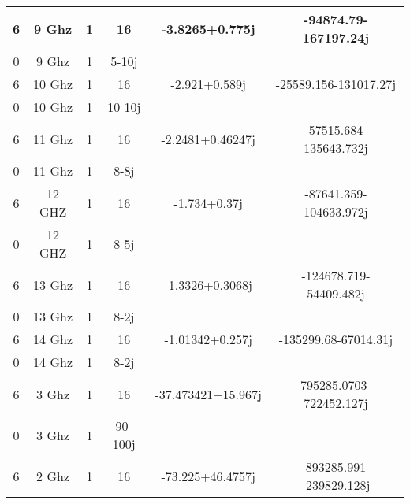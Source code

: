\documentclass[12pt,letterpaper]{report}
\numberwithin{equation}{section}
\begin{document}
\begin{table}[H]
\begin{tabular}{@{}|c|c|c|c|c|c|@{}}
		6              & 9 Ghz                   & 1                 & 16                 & -3.8265+0.775j     & -94874.79-167197.24j    \\ \midrule
		0              & 9 Ghz                   & 1                 & 5-10j              &                    &                         \\ \midrule
		6              & 10 Ghz                  & 1                 & 16                 & -2.921+0.589j      & -25589.156-131017.27j   \\ \midrule
		0              & 10 Ghz                  & 1                 & 10-10j             &                    &                         \\ \midrule
		6              & 11 Ghz                  & 1                 & 16                 & -2.2481+0.46247j   & -57515.684-135643.732j  \\ \midrule
		0              & 11 Ghz                  & 1                 & 8-8j               &                    &                         \\ \midrule
		6              & 12 GHZ                  & 1                 & 16                 & -1.734+0.37j       & -87641.359-104633.972j  \\ \midrule
		0              & 12 GHZ                  & 1                 & 8-5j               &                    &                         \\ \midrule
		6              & 13 Ghz                  & 1                 & 16                 & -1.3326+0.3068j    & -124678.719-54409.482j  \\ \midrule
		0              & 13 Ghz                  & 1                 & 8-2j               &                    &                         \\ \midrule
		6              & 14 Ghz                  & 1                 & 16                 & -1.01342+0.257j    & -135299.68-67014.31j    \\ \midrule
		0              & 14 Ghz                  & 1                 & 8-2j               &                    &                         \\ \midrule
		6              & 3 Ghz                   & 1                 & 16                 & -37.473421+15.967j & 795285.0703-722452.127j \\ \midrule
		0              & 3 Ghz                   & 1                 & 90-100j            &                    &                         \\ \midrule
		6              & 2 Ghz                   & 1                 & 16                 & -73.225+46.4757j   & 893285.991 -239829.128j \\ \midrule

\end{tabular}
\end{table}
\end{document}
